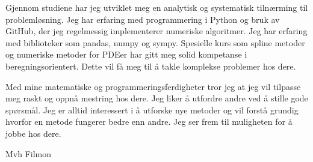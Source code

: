\documentclass[a4paper,12pt]{letter}
\begin{document}
Gjennom studiene har jeg utviklet meg en analytisk og systematisk tilnærming til problemløsning. Jeg har erfaring med programmering i Python og bruk av GitHub, der jeg regelmessig implementerer numeriske algoritmer. Jeg har erfaring med biblioteker som pandas, numpy og sympy. Spesielle kurs som spline metoder og numeriske metoder for PDEer har gitt meg solid kompetanse i beregningsorientert. Dette vil få meg til å takle komplekse problemer hos dere.

Med mine matematiske og programmeringsferdigheter tror jeg at jeg vil tilpasse meg raskt og oppnå mestring hos dere. Jeg liker å utfordre andre ved å stille gode spørsmål. Jeg er alltid interessert i å utforske nye metoder og vil forstå grundig hvorfor en metode fungerer bedre enn andre. Jeg ser frem til muligheten for å jobbe hos dere.

Mvh
Filmon
\end{document}
